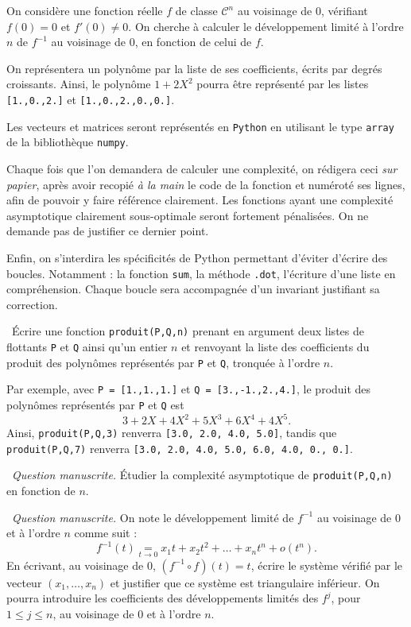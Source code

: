On considère une fonction réelle $f$ de classe $\mathscr{C}^n$ au voisinage de $0$, vérifiant $f(0) = 0$ et $f'(0) \neq 0$. 
On cherche à calculer le développement limité à l'ordre $n$ de $f^{-1}$ au voisinage de $0$, en fonction de celui de $f$. 

On représentera un polynôme par la liste de ses coefficients, écrits par degrés croissants. Ainsi, le polynôme $1+2X^2$ pourra être représenté par les listes \texttt{[1.,0.,2.]} et \texttt{[1.,0.,2.,0.,0.]}.

Les vecteurs et matrices seront représentés en \texttt{Python} en utilisant le type \texttt{array} de la bibliothèque \texttt{numpy}. 

Chaque fois que l'on demandera de calculer une complexité, on rédigera ceci \emph{sur papier}, après avoir recopié \emph{à la main} le code de la fonction et numéroté ses lignes, afin de pouvoir y faire référence clairement. 
Les fonctions ayant une complexité asymptotique clairement sous-optimale seront fortement pénalisées.
On ne demande pas de justifier ce dernier point. 

Enfin, on s'interdira les spécificités de Python permettant d'éviter d'écrire des boucles. Notamment : la fonction \texttt{sum}, la méthode \texttt{.dot}, l'écriture d'une liste en compréhension. Chaque boucle sera accompagnée d'un invariant justifiant sa correction. 

\medskip

\question\ Écrire une fonction  \texttt{produit(P,Q,n)} prenant en argument deux listes de flottants \texttt{P} et \texttt{Q} ainsi qu'un entier $n$ et renvoyant la liste des coefficients du produit des polynômes représentés par \texttt{P} et \texttt{Q}, tronquée à l'ordre $n$. 

Par exemple, avec \texttt{P = [1.,1.,1.]} et \texttt{Q = [3.,-1.,2.,4.]}, le produit des polynômes représentés par \texttt{P} et \texttt{Q} est 
\begin{equation*}
  3+2X+4X^2+5X^3+6X^4+4X^5. 
\end{equation*}
Ainsi, \texttt{produit(P,Q,3)} renverra \texttt{[3.0, 2.0, 4.0, 5.0]}, tandis que \texttt{produit(P,Q,7)} renverra \texttt{[3.0, 2.0, 4.0, 5.0, 6.0, 4.0, 0., 0.]}.

\medskip

\question\ \emph{Question manuscrite.} Étudier la complexité asymptotique de \texttt{produit(P,Q,n)} en fonction de $n$. 

\medskip

\question\ \emph{Question manuscrite.} On note le développement limité de $f^{-1}$ au voisinage de $0$ et à l'ordre $n$ comme suit : 
\begin{equation*}
  f^{-1}(t) \underset{t\to0}{=} x_1t + x_2t^2 + \dots +x_n t^n + o(t^n).
\end{equation*}
En écrivant, au voisinage de $0$, $(f^{-1}\circ f)(t) = t$, écrire le système vérifié par le vecteur $(x_1,\dots ,x_n)$ et justifier que ce système est triangulaire inférieur. 
On pourra introduire les coefficients des développements limités des $f^j$, pour $1 \leq j \leq n$, au voisinage de $0$ et à l'ordre $n$. 

